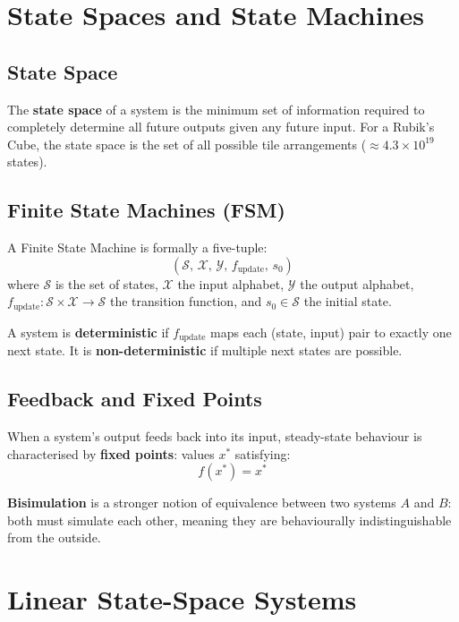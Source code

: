 \documentclass[11pt]{article}
\begin{document}
 
\section{State Spaces and State Machines}

\subsection{State Space}

The \textbf{state space} of a system is the minimum set of information required to completely determine all future outputs given any future input. For a Rubik's Cube, the state space is the set of all possible tile arrangements ($\approx 4.3 \times 10^{19}$ states).

\subsection{Finite State Machines (FSM)}

A Finite State Machine is formally a five-tuple:
\[
  \left(\mathcal{S},\, \mathcal{X},\, \mathcal{Y},\, f_{\text{update}},\, s_0\right)
\]
where $\mathcal{S}$ is the set of states, $\mathcal{X}$ the input alphabet, $\mathcal{Y}$ the output alphabet, $f_{\text{update}} : \mathcal{S} \times \mathcal{X} \rightarrow \mathcal{S}$ the transition function, and $s_0 \in \mathcal{S}$ the initial state.

A system is \textbf{deterministic} if $f_{\text{update}}$ maps each (state, input) pair to exactly one next state. It is \textbf{non-deterministic} if multiple next states are possible.

\subsection{Feedback and Fixed Points}

When a system's output feeds back into its input, steady-state behaviour is characterised by \textbf{fixed points}: values $x^*$ satisfying:
\[
  f(x^*) = x^*
\]

\textbf{Bisimulation} is a stronger notion of equivalence between two systems $A$ and $B$: both must simulate each other, meaning they are behaviourally indistinguishable from the outside.

 
\section{Linear State-Space Systems}
\end{document}
